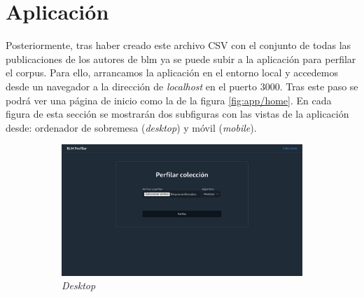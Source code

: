 \section{Aplicación}
Posteriormente, tras haber creado este archivo CSV con el conjunto de todas las publicaciones de los autores de \acrshort{blm} ya se puede subir a la aplicación para perfilar el corpus. Para ello, arrancamos la aplicación en el entorno local y accedemos desde un navegador a la dirección de \textit{localhost} en el puerto 3000. Tras este paso se podrá ver una página de inicio como la de la figura \ref{fig:app/home}. En cada figura de esta sección se mostrarán dos subfiguras con las vistas de la aplicación desde: ordenador de sobremesa (\textit{desktop}) y móvil (\textit{mobile}).

\begin{figure}[H]
  \centering
  \begin{subfigure}{0.7\textwidth}
       \includegraphics[width=\textwidth]{imaxes/capturas-app/desktop/home.png}
      \caption{\textit{Desktop}} 
  \end{subfigure}
  \begin{subfigure}{0.2215\textwidth}

\end{subfigure}
\end{figure}
